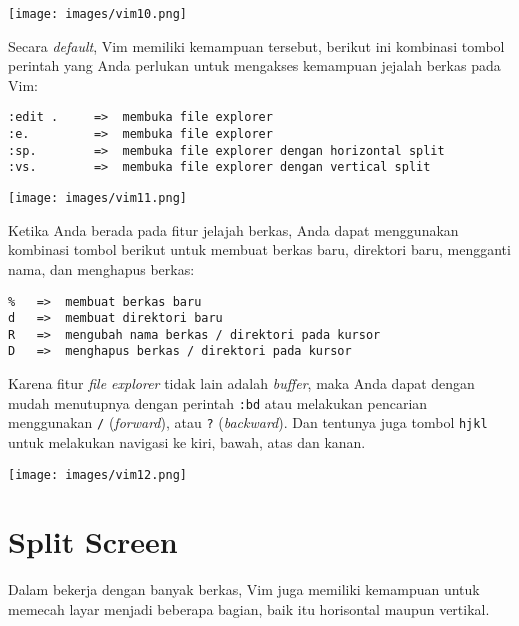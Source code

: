\documentclass{article}
\begin{document}
\vspace{12pt}

\texttt{[image: images/vim10.png]}

\vspace{12pt}

Secara \emph{default}, Vim memiliki kemampuan tersebut,
berikut ini kombinasi tombol perintah yang Anda perlukan
untuk mengakses kemampuan jejalah berkas pada Vim:

\begin{verbatim}
:edit .     =>  membuka file explorer
:e.         =>  membuka file explorer
:sp.        =>  membuka file explorer dengan horizontal split
:vs.        =>  membuka file explorer dengan vertical split
\end{verbatim}

\vspace{12pt}

\texttt{[image: images/vim11.png]}

\vspace{12pt}

Ketika Anda berada pada fitur jelajah berkas, Anda dapat
menggunakan kombinasi tombol berikut untuk membuat berkas
baru, direktori baru, mengganti nama, dan menghapus berkas:

\begin{verbatim}
%   =>  membuat berkas baru
d   =>  membuat direktori baru
R   =>  mengubah nama berkas / direktori pada kursor
D   =>  menghapus berkas / direktori pada kursor
\end{verbatim}

Karena fitur \emph{file explorer} tidak lain adalah
\emph{buffer}, maka Anda dapat dengan mudah menutupnya
dengan perintah \verb=:bd= atau melakukan pencarian
menggunakan \verb=/= (\emph{forward}), atau \verb=?=
(\emph{backward}). Dan tentunya juga tombol \verb=hjkl=
untuk melakukan navigasi ke kiri, bawah, atas dan kanan.

\vspace{12pt}

\texttt{[image: images/vim12.png]}

\vspace{12pt}

\section{Split Screen}
Dalam bekerja dengan banyak berkas, Vim juga memiliki
kemampuan untuk memecah layar menjadi beberapa bagian, baik
itu horisontal maupun vertikal.
\end{document}
